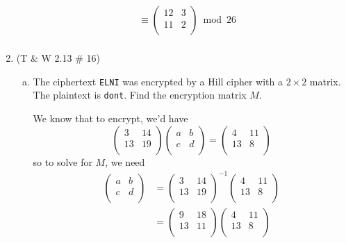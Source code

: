 \documentclass[12pt]{amsart}
\theoremstyle{plain}
\theoremstyle{definition}
\begin{document}
\begin{enumerate}[1.]
\begin{framed}
\begin{align*}
	&\equiv \left( \begin{array}{rr}12&3\\11&2\\\end{array}\right) \bmod 26\\
	\end{align*}
	\end{framed}
		\item (T \& W 2.13 \# 16)
		\begin{enumerate}[a.]
		\item The ciphertext \texttt{ELNI} was encrypted by a Hill cipher with a $2 \times 2$ matrix.  The plaintext is \texttt{dont}.  Find the encryption matrix $M$.
		\begin{framed}
		We know that to encrypt, we'd have $$\left( \begin{array}{rr}3&14\\13&19\\\end{array}\right)\left( \begin{array}{rr}a&b\\c&d\\\end{array}\right) = \left( \begin{array}{rr}4&11\\13&8\\\end{array}\right)$$
	so to solve for $M$, we need
		\begin{align*}
		\left( \begin{array}{rr}a&b\\c&d\\\end{array}\right) &= \left( \begin{array}{rr}3&14\\13&19\\\end{array}\right)^{-1}\left( \begin{array}{rr}4&11\\13&8\\\end{array}\right)\\
		&= \left( \begin{array}{rr}9&18\\13&11\\\end{array}\right)\left( \begin{array}{rr}4&11\\13&8\\\end{array}\right)\\

\end{align*}
\end{framed}
\end{enumerate}
\end{enumerate}
\end{document}
